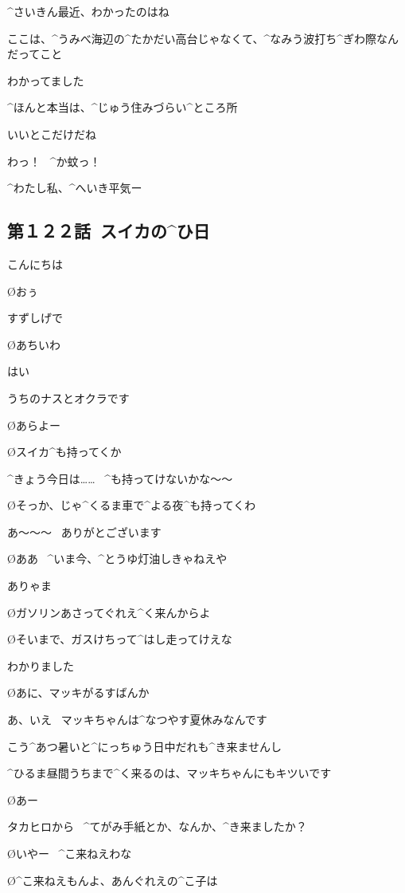 \page[17]
\A ^{さいきん}{最近}、わかったのはね

\A ここは、^{うみべ}{海辺}の^{たかだい}{高台}じゃなくて、^{なみう}{波打}ち^{ぎわ}{際}なんだってこと

\M わかってました

\A ^{ほんと}{本当}は、^{じゅう}{住}みづらい^{ところ}{所}

\M いいとこだけだね

\page
\M わっ！
\ ^{か}{蚊}っ！

\A ^{わたし}{私}、^{へいき}{平気}ー


\subsection{第１２２話\ スイカの^{ひ}{日}}

\page[21]
\A こんにちは

\O おぅ

\A すずしげで

\O あちいわ

\A はい

\A うちのナスとオクラです

\O あらよー

\page
\O スイカ^{も}{持}ってくか

\A ^{きょう}{今日}は……
\ ^{も}{持}ってけないかな〜〜

\O そっか、じゃ^{くるま}{車}で^{よる}{夜}^{も}{持}ってくわ

\A あ〜〜〜
\ ありがとございます

\O ああ
\ ^{いま}{今}、^{とうゆ}{灯油}しきゃねえや

\A ありゃま

\O ガソリンあさってぐれえ^{く}{来}んからよ

\O そいまで、ガスけちって^{はし}{走}ってけえな

\A わかりました

\page[24]
\O あに、マッキがるすばんか

\A あ、いえ
\ マッキちゃんは^{なつやす}{夏休}みなんです

\A こう^{あつ}{暑}いと^{にっちゅう}{日中}だれも^{き}{来}ませんし

\A ^{ひるま}{昼間}うちまで^{く}{来}るのは、マッキちゃんにもキツいです

\O あー

\page
\A タカヒロから
\ ^{てがみ}{手紙}とか、なんか、^{き}{来}ましたか？

\O いやー
\ ^{こ}{来}ねえわな

\O ^{こ}{来}ねえもんよ、あんぐれえの^{こ}{子}は


